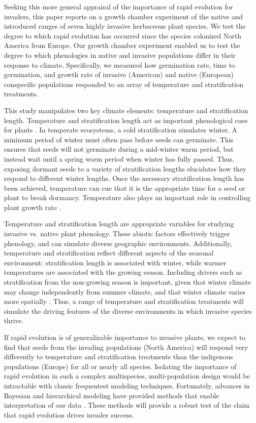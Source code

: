 \documentclass[12pt]{article}\usepackage[]{graphicx}\usepackage[]{color}
\begin{document}
	Seeking this more general appraisal of the importance of rapid evolution for invaders, this paper reports on a growth chamber experiment of the native and introduced ranges of seven highly invasive herbaceous plant species. We test the degree to which rapid evolution has occurred since the species colonized North America from Europe.  Our growth chamber experiment enabled us to test the degree to which phenologies in native and invasive populations differ in their response to climate.   Specifically, we measured how germination rate, time to germination, and growth rate of invasive (American) and native (European) conspecific populations responded to an array of temperature and stratification treatments.
	
	This study manipulates two key climate elements: temperature and stratification length. Temperature and stratification length act as important phenological cues for plants \parencite{Finch2006}. In temperate ecosystems, a cold stratification simulates winter. A minimum period of winter must often pass before seeds can germinate. This ensures that seeds will not germinate during a mid-winter warm period, but instead wait until a spring warm period when winter has fully passed. Thus, exposing dormant seeds to a variety of stratification lengths elucidates how they respond to different winter lengths. Once the necessary stratification length has been achieved, temperature can cue that it is the appropriate time for a seed or plant to break dormancy. Temperature also plays an important role in controlling plant growth rate \parencite{Egli1980,Guilioni2003}.
	
	Temperature and stratification length are appropriate variables for studying invasive vs. native plant phenology. These abiotic factors effectively trigger phenology, and can simulate diverse geographic environments. Additionally, temperature and stratification reflect different aspects of the seasonal environment: stratification length is associated with winter, while warmer temperatures are associated with the growing season. Including drivers such as stratification from the non-growing season is important, given that winter climate may change independently from summer climate, and that winter climate varies more spatially \parencite{Bonan2003}. Thus, a range of temperature and stratification treatments will simulate the driving features of the diverse environments in which invasive species thrive. 
	
	 If rapid evolution is of generalizable importance to invasive plants, we expect to find that seeds from the invading populations (North America) will respond very differently to temperature and stratification treatments than the indigenous populations (Europe) for all or nearly all species. Isolating the importance of rapid evolution in such a complex multispecies, multi-population design would be intractable with classic frequentest modeling  techniques. Fortunately, advances in Bayesian and hierarchical modeling have provided methods that enable interpretation of our data \parencite{Carpenter2017}.  These methods will provide a robust test of the claim that rapid evolution drives invader success.
	 
\end{document}
